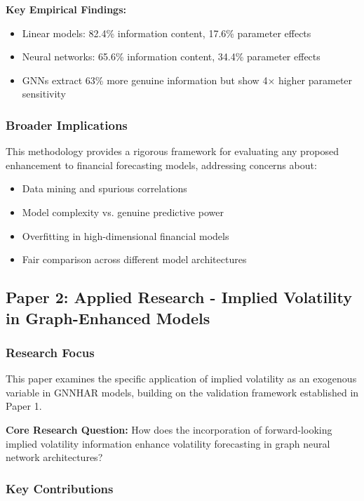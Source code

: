 \documentclass[12pt,a4paper]{article}
\begin{document}
\textbf{Key Empirical Findings:}
\begin{itemize}
\item Linear models: 82.4\% information content, 17.6\% parameter effects
\item Neural networks: 65.6\% information content, 34.4\% parameter effects
\item GNNs extract 63\% more genuine information but show 4× higher parameter sensitivity
\end{itemize}

\subsubsection{Broader Implications}

This methodology provides a rigorous framework for evaluating any proposed enhancement to financial forecasting models, addressing concerns about:
\begin{itemize}
\item Data mining and spurious correlations
\item Model complexity vs. genuine predictive power
\item Overfitting in high-dimensional financial models
\item Fair comparison across different model architectures
\end{itemize}

\subsection{Paper 2: Applied Research - Implied Volatility in Graph-Enhanced Models}

\subsubsection{Research Focus}

This paper examines the specific application of implied volatility as an exogenous variable in GNNHAR models, building on the validation framework established in Paper 1.

\textbf{Core Research Question:} How does the incorporation of forward-looking implied volatility information enhance volatility forecasting in graph neural network architectures?

\subsubsection{Key Contributions}
\end{document}
